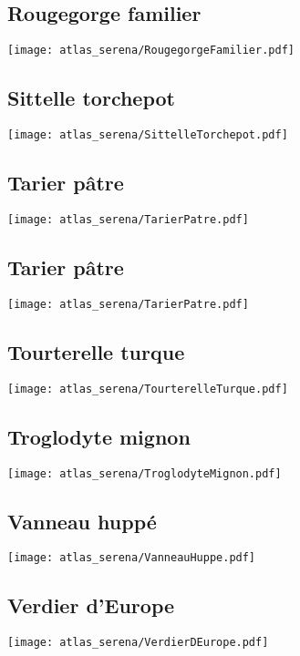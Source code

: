 \subsection{Rougegorge familier}
\texttt{[image: atlas\_serena/RougegorgeFamilier.pdf]}
\subsection{Sittelle torchepot}
\texttt{[image: atlas\_serena/SittelleTorchepot.pdf]}
\subsection{Tarier pâtre}
\texttt{[image: atlas\_serena/TarierPatre.pdf]}
\subsection{Tarier pâtre}
\texttt{[image: atlas\_serena/TarierPatre.pdf]}
\subsection{Tourterelle turque}
\texttt{[image: atlas\_serena/TourterelleTurque.pdf]}
\subsection{Troglodyte mignon}
\texttt{[image: atlas\_serena/TroglodyteMignon.pdf]}
\subsection{Vanneau huppé}
\texttt{[image: atlas\_serena/VanneauHuppe.pdf]}
\subsection{Verdier d'Europe}
\texttt{[image: atlas\_serena/VerdierDEurope.pdf]}
